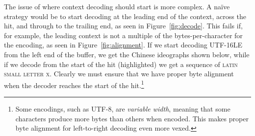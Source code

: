 \documentclass[5p,final,number,sort&compress]{elsarticle}
\begin{document}
The issue of where context decoding should start is more complex. A na\"ive strategy would be to start decoding at the leading end of the context, across the hit, and through to the trailing end, as seen in Figure~\ref{fig:decode}. This fails if, for example, the leading context is not a multiple of the bytes-per-character for the encoding, as seen in Figure~\ref{fig:alignment}. If we start decoding UTF-16LE from the left end of the buffer, we get the Chinese ideographs shown below, while if we decode from the start of the hit (highlighted) we get a sequence of \textsc{latin small letter x}. Clearly we must ensure that we have proper byte alignment when the decoder reaches the start of the hit.\footnote{Some encodings, such as UTF-8, are \emph{variable width}, meaning that some characters produce more bytes than others when encoded. This makes proper byte alignment for left-to-right decoding even more vexed.}
\end{document}
